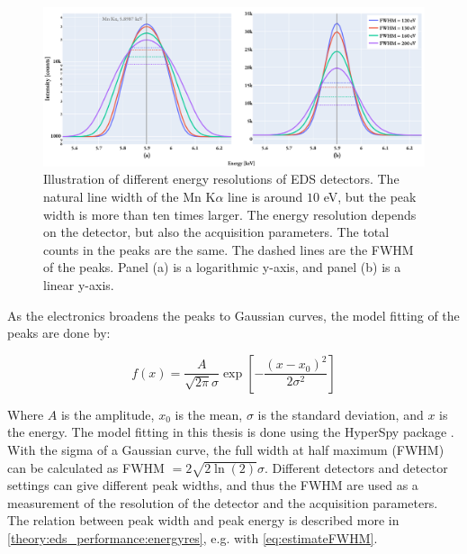 \begin{figure}[ht]
    \centering
    \includegraphics[width=0.95\linewidth]{figures/eds_energyResolutionsMnKa.pdf}
    \caption{
        Illustration of different energy resolutions of EDS detectors.
        The natural line width of the Mn K$\alpha$ line is around $10$ eV, but the peak width is more than ten times larger.
        The energy resolution depends on the detector, but also the acquisition parameters.
        The total counts in the peaks are the same.
        The dashed lines are the FWHM of the peaks.
        Panel (a) is a logarithmic y-axis, and panel (b) is a linear y-axis.
    }
    \label{fig:theory:energy_resolution}
\end{figure}





As the electronics broadens the peaks to Gaussian curves, the model fitting of the peaks are done by:

\begin{equation}
    \label{eq:gaussian}
    f(x) = \frac{A}{\sqrt{2\pi}\sigma}\exp\left[{-\frac{(x-x_0)^2}{2\sigma^2}}\right]
\end{equation}

Where $A$ is the amplitude, $x_0$ is the mean, $\sigma$ is the standard deviation, and $x$ is the energy.
The model fitting in this thesis is done using the HyperSpy package \cite{hyperspy_1.7.1}.
With the sigma of a Gaussian curve, the full width at half maximum (FWHM) can be calculated as FWHM $= 2\sqrt{2\ln(2)}\sigma$.
Different detectors and detector settings can give different peak widths, and thus the FWHM are used as a measurement of the resolution of the detector and the acquisition parameters.
The relation between peak width and peak energy is described more in \cref{theory:eds_performance:energyres}, e.g. with \cref{eq:estimateFWHM}.
































